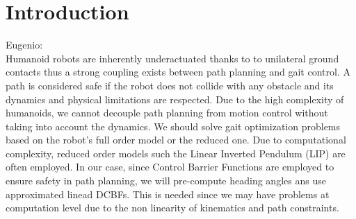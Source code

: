 \documentclass[main.tex]{subfiles}
\begin{document}
\section{Introduction}\label{sec:introduction}
Eugenio:\\
Humanoid robots are inherently underactuated thanks to to unilateral ground contacts thus a strong coupling exists between path planning and gait control. A path is considered safe if the robot does not collide with any obstacle and its dynamics and physical limitations are respected.
Due to the high complexity of humanoids, we cannot decouple path planning from motion control without taking into account the dynamics. We should solve gait optimization problems based on the robot's full order model or the reduced one. Due to computational complexity, reduced order models such the Linear Inverted Pendulum (LIP) are often employed. In our case, since Control Barrier Functions are employed to ensure safety in path planning, we will pre-compute heading angles ans use approximated linead DCBFs.
This is needed since we may have problems at computation level due to the non linearity of kinematics and path constraints.

\cite{hsu1989dynamic}
\end{document}
